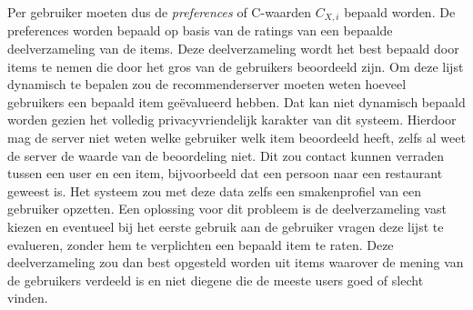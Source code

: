 Per gebruiker moeten dus de \emph{preferences} of C-waarden $C_{X,i}$ bepaald worden. De preferences worden bepaald op basis van de ratings van een bepaalde deelverzameling van de items. Deze deelverzameling wordt het best bepaald door items te nemen die door het gros van de gebruikers beoordeeld zijn. Om deze lijst dynamisch te bepalen zou de recommenderserver moeten weten hoeveel gebruikers een bepaald item ge\"evalueerd hebben. Dat kan niet dynamisch bepaald worden gezien het volledig privacyvriendelijk karakter van dit systeem. Hierdoor mag de server niet weten welke gebruiker welk item beoordeeld heeft, zelfs al weet de server de waarde van de beoordeling niet.
Dit zou contact kunnen verraden tussen een user en een item, bijvoorbeeld dat een persoon naar een restaurant geweest is.
Het systeem zou met deze data zelfs een smakenprofiel van een gebruiker opzetten. Een oplossing voor dit probleem is de deelverzameling vast kiezen en eventueel bij het eerste gebruik aan de gebruiker vragen deze lijst te evalueren, zonder hem te verplichten een bepaald item te raten. Deze deelverzameling zou dan best opgesteld worden uit items waarover de mening van de gebruikers verdeeld is en niet diegene die de meeste users goed of slecht vinden. 

